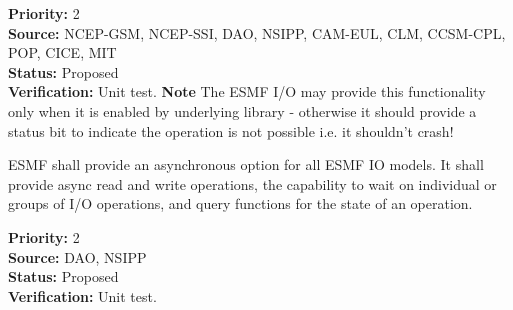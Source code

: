\begin{reqlist}
{\bf Priority:} 2 \\
{\bf Source:} NCEP-GSM, NCEP-SSI, DAO, NSIPP, CAM-EUL, CLM, CCSM-CPL, POP, CICE, MIT \\
{\bf Status:} Proposed \\
{\bf Verification:} Unit test.
{\bf Note} The ESMF I/O may provide this functionality only when it is 
enabled by underlying library - otherwise it should provide a status
bit to indicate the operation is not possible i.e. it shouldn't crash!
\end{reqlist}


ESMF shall provide an asynchronous option for all ESMF IO models.
It shall provide async read and write operations, 
the capability to wait on individual or groups of I/O operations,
and query functions for the state of an operation.

\begin{reqlist}
{\bf Priority:} 2 \\
{\bf Source:} DAO, NSIPP\\
{\bf Status:} Proposed \\
{\bf Verification:} Unit test.
\end{reqlist}


